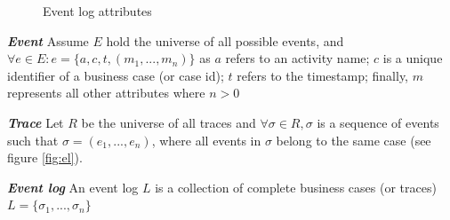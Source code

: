 \begin{figure}[htb]
	\begin{center}
		\caption{Event log attributes}
		\label{fig:attr}
	\end{center}
\end{figure}



\theoremstyle{definition}
\begin{definition}{\textit{\textbf{Event}}}
	Assume $E$ hold the universe of all possible events, and $ \forall e \in E: e = \{a, c, t, (m_1, ..., m_n)\}$ as $a$ refers to an activity name; $c$ is a unique identifier of a business case (or case id); $t$ refers to the timestamp; finally, $m$ represents all other attributes where $n > 0$
\end{definition}


\begin{definition}{\textit{\textbf{Trace}}}
	Let $R$ be the universe of all traces and $\forall \sigma \in R,  \sigma$ is a sequence of events such that $\sigma = (e_1, ..., e_n)$, where all events in $ \sigma $ belong to the same case (see figure \ref{fig:el}).
\end{definition}

\begin{definition}{\textit{\textbf{Event log}}}
	An event log $L$ is a collection of complete business cases (or traces) $L=\{\sigma_1, ..., \sigma_n \}$
	
\end{definition}

